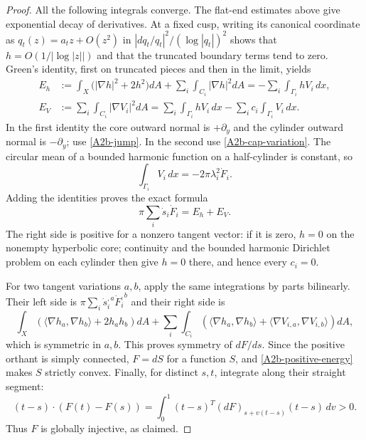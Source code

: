 \begin{proof}
All the following integrals converge. The flat-end estimates above give
exponential decay of derivatives. At a fixed cusp, writing its canonical
coordinate as $q_t(z)=a_tz+O(z^2)$ in
$|dq_t/q_t|^2/(\log|q_t|)^2$ shows that
$h=O(1/|\log|z||)$ and that the truncated boundary terms tend to zero.
Green's identity, first on truncated pieces and then in the limit, yields
\begin{align*}
 E_h&:=\int_X\bigl(|\nabla h|^2+2h^2\bigr)dA
       +\sum_i\int_{C_i}|\nabla h|^2dA
       =-\sum_i\int_{\Gamma_i}hV_i\,dx,\\
 E_V&:=\sum_i\int_{C_i}|\nabla V_i|^2dA
       =\sum_i\int_{\Gamma_i}hV_i\,dx
          -\sum_i c_i\int_{\Gamma_i}V_i\,dx.
\end{align*}
In the first identity the core outward normal is $+\partial_y$ and
the cylinder outward normal is $-\partial_y$; use
\eqref{A2b-jump}. In the second use
\eqref{A2b-cap-variation}. The circular mean of a bounded harmonic
function on a half-cylinder is constant, so
\[
 \int_{\Gamma_i}V_i\,dx=-2\pi\lambda_i^2\dot F_i.
\]
Adding the identities proves the exact formula
\begin{equation}\label{A2b-positive-energy}
 \boxed{\quad
  \pi\sum_i\dot s_i\dot F_i
       =E_h+E_V.\quad}
\end{equation}
The right side is positive for a nonzero tangent vector: if it is zero,
$h=0$ on the nonempty hyperbolic core; continuity and the bounded
harmonic Dirichlet problem on each cylinder then give $h=0$ there,
and hence every $c_i=0$.

For two tangent variations $a,b$, apply the same integrations by parts
bilinearly. Their left side is
$\pi\sum_i\dot s_i^{,a}\dot F_i^{,b}$ and their right side is
\[
 \int_X(\langle\nabla h_a,\nabla h_b\rangle+2h_ah_b)dA
 +\sum_i\int_{C_i}
   (\langle\nabla h_a,\nabla h_b\rangle+
    \langle\nabla V_{i,a},\nabla V_{i,b}\rangle)dA,
\]
which is symmetric in $a,b$. This proves symmetry of $dF/ds$.
Since the positive orthant is simply connected, $F=dS$ for a function
$S$, and \eqref{A2b-positive-energy} makes $S$ strictly convex.
Finally, for distinct $s,t$, integrate along their straight segment:
\[
 (t-s)\cdot(F(t)-F(s))
 =\int_0^1 (t-s)^T(dF)_{s+v(t-s)}(t-s)\,dv>0.
\]
Thus $F$ is globally injective, as claimed.
\end{proof}

